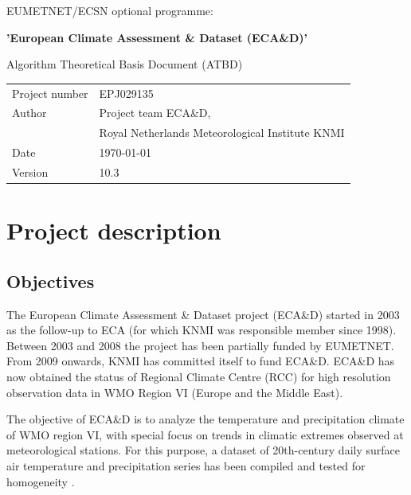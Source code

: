\documentclass[a4paper,11pt]{article}
\begin{document}
\vspace{2cm}
\pagestyle{empty}

{\Large{EUMETNET/ECSN optional programme:}}
\vspace{1cm}

{\Large{\textbf{'European Climate Assessment \& Dataset (ECA\&D)'}}}
\vspace{1cm}

{\Large{Algorithm Theoretical Basis Document (ATBD)}}
\vspace{10cm}

\begin{tabular}{l@{: }l}
Project number & EPJ029135\\
Author & Project team ECA\&D,\\
& Royal Netherlands Meteorological Institute KNMI\\
Date & \today \\
Version & 10.3\\
\end{tabular}

\newpage
{}
\pagestyle{plain}

\tableofcontents

\newpage

\section{Project description}

\subsection{Objectives}
\label{sec:obj}

The European Climate Assessment \& Dataset project (ECA\&D) started in
2003 as the follow-up to ECA (for which KNMI was responsible member
since 1998). Between 2003 and 2008 the project has been partially
funded by EUMETNET. From 2009 onwards, KNMI has committed itself to
fund ECA\&D.
ECA\&D has now obtained the status of Regional Climate Centre (RCC)
for high resolution observation data in WMO Region VI (Europe and
the Middle East). 

The objective of ECA\&D is to analyze the temperature and
precipitation climate of WMO region VI, with special focus on trends
in climatic extremes observed at meteorological stations. For this
purpose, a dataset of 20th-century daily surface air temperature and
precipitation series has been compiled \citep{kleintank2002} and
tested for homogeneity \citep{wijngaard}.
\end{document}
